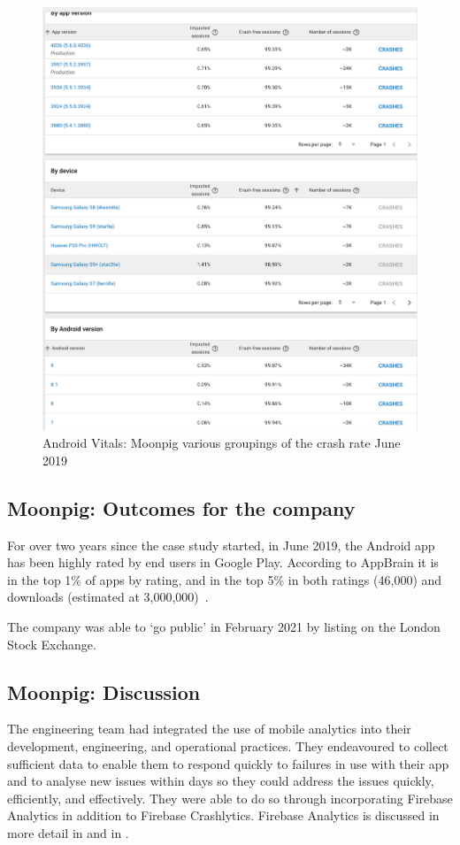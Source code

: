 \begin{figure}
    \centering
    \includegraphics[width=13cm]{images/android-vitals-screenshots/moonpig/Screenshot 2019-06-10 at 15.41.23.png}
    \caption{Android Vitals: Moonpig various groupings of the crash rate  June 2019}
    \label{fig:av-moonpig-crash-rate-groupings}
\end{figure}

\subsection{Moonpig: Outcomes for the company}
For over two years since the case study started, in June 2019, the Android app has been highly rated by end users in Google Play. According to AppBrain it is in the top 1\% of apps by rating, and in the top 5\% in both ratings (46,000) and downloads (estimated at 3,000,000)~\citep{appbrain_moonpig}.

The company was able to `go public' in February 2021 by listing on the London Stock Exchange.  

\subsection{Moonpig: Discussion}
The engineering team had integrated the use of mobile analytics into their development, engineering, and operational practices. They endeavoured to collect sufficient data to enable them to respond quickly to failures in use with their app and to analyse new issues within days so they could address the issues quickly, efficiently, and effectively. They were able to do so through incorporating Firebase Analytics in addition to Firebase Crashlytics. Firebase Analytics is discussed in more detail in  and in .

